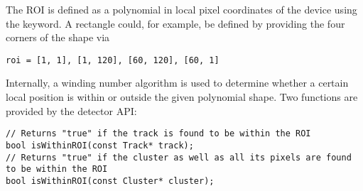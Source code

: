 The ROI is defined as a polynomial in local pixel coordinates of the device using the  keyword. A rectangle could, for example, be defined by providing the four corners of the shape via

\begin{verbatim}
roi = [1, 1], [1, 120], [60, 120], [60, 1]
\end{verbatim}

Internally, a winding number algorithm is used to determine whether a certain local position is within or outside the given polynomial shape.
Two functions are provided by the detector API:

\begin{verbatim}
// Returns "true" if the track is found to be within the ROI
bool isWithinROI(const Track* track);
// Returns "true" if the cluster as well as all its pixels are found to be within the ROI
bool isWithinROI(const Cluster* cluster);
\end{verbatim}
